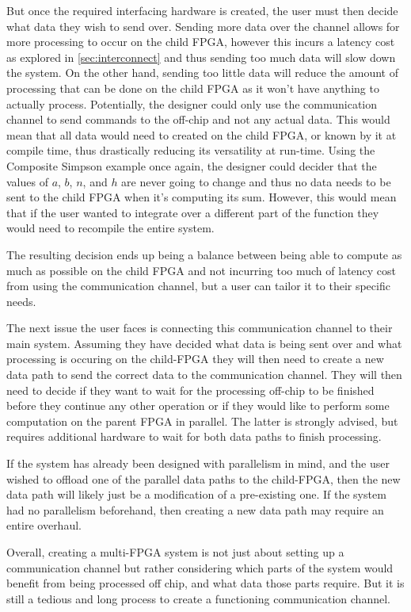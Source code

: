 But once the required interfacing hardware is created, the user must then decide what data they wish to send over. Sending more data over the channel allows for more processing to occur on the child FPGA, however this incurs a latency cost as explored in \autoref{sec:interconnect} and thus sending too much data will slow down the system. On the other hand, sending too little data will reduce the amount of processing that can be done on the child FPGA as it won't have anything to actually process. Potentially, the designer could only use the communication channel to send commands to the off-chip and not any actual data. This would mean that all data would need to created on the child FPGA, or known by it at compile time, thus drastically reducing its versatility at run-time. Using the Composite Simpson example once again, the designer could decider that the values of $a$, $b$, $n$, and $h$ are never going to change and thus no data needs to be sent to the child FPGA when it's computing its sum. However, this would mean that if the user wanted to integrate over a different part of the function they would need to recompile the entire system. 

The resulting decision ends up being a balance between being able to compute as much as possible on the child FPGA and not incurring too much of latency cost from using the communication channel, but a user can tailor it to their specific needs.

The next issue the user faces is connecting this communication channel to their main system. Assuming they have decided what data is being sent over and what processing is occuring on the child-FPGA they will then need to create a new data path to send the correct data to the communication channel. They will then need to decide if they want to wait for the processing off-chip to be finished before they continue any other operation or if they would like to perform some computation on the parent FPGA in parallel. The latter is strongly advised, but requires additional hardware to wait for both data paths to finish processing.

If the system has already been designed with parallelism in mind, and the user wished to offload one of the parallel data paths to the child-FPGA, then the new data path will likely just be a modification of a pre-existing one. If the system had no parallelism beforehand, then creating a new data path may require an entire overhaul.

Overall, creating a multi-FPGA system is not just about setting up a communication channel but rather considering which parts of the system would benefit from being processed off chip, and what data those parts require. But it is still a tedious and long process to create a functioning communication channel.

